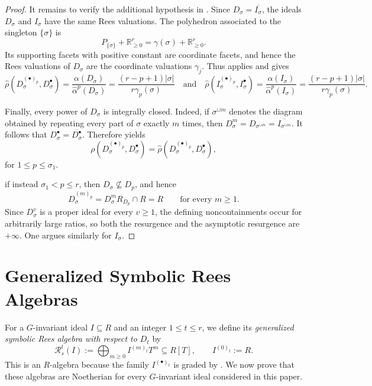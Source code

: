 \documentclass[11pt, reqno]{amsart}
\numberwithin{equation}{section}
\theoremstyle{definition}
\newcommand{\RR}{{\mathbb R}}
\newcommand{\s}{\sigma}
\begin{document}
\begin{proof}
It remains to verify the additional hypothesis in . Since $D_\sigma=\overline{I_\sigma}$, the ideals $D_\sigma$ and $I_\sigma$ have the same Rees valuations. The polyhedron associated to the singleton $\{\sigma\}$ is
\[
P_{\{\sigma\}}+\RR_{\geq0}^r
=\gamma(\sigma)+\RR_{\geq0}^r.
\]
Its supporting facets with positive constant are coordinate facets, and hence the Rees valuations of $D_\sigma$ are the coordinate valuations $\gamma_j$. Thus  applies and gives
\[
\widehat{\rho}(D_\sigma^{(\bullet)_p},D_\sigma^\bullet)
=\frac{\alpha(D_\sigma)}{\widehat{\alpha}^p(D_\sigma)}
=\frac{(r-p+1)|\sigma|}{r\gamma_p(\sigma)}
\quad \text{and} \quad
\widehat{\rho}(I_\sigma^{(\bullet)_p},I_\sigma^\bullet)
=\frac{\alpha(I_\sigma)}{\widehat{\alpha}^p(I_\sigma)}
=\frac{(r-p+1)|\sigma|}{r\gamma_p(\sigma)}.
\]

Finally, every power of $D_\sigma$ is integrally closed. Indeed, if $\sigma^{\sqcup m}$ denotes the diagram obtained by repeating every part of $\sigma$ exactly $m$ times, then
$
D_\sigma^m=D_{\sigma^{\sqcup m}}
=\overline{I_{\sigma^{\sqcup m}}}$.
It follows that $D_\sigma^\bullet=\overline{D_\sigma^\bullet}$. Therefore  yields
\[
\rho(D_\sigma^{(\bullet)_p},D_\sigma^\bullet)
=\widehat{\rho}(D_\sigma^{(\bullet)_p},D_\sigma^\bullet),
\]
for $1\leq p\leq\sigma_1$.

if instead $\sigma_1<p\leq r$, then $D_\sigma\not\subseteq D_p$, and hence
\[
D_\sigma^{(m)_p}=D_\sigma^mR_{D_p}\cap R=R
\qquad\text{for every }m\geq1.
\]
Since $D_\sigma^v$ is a proper ideal for every $v\geq1$, the defining noncontainments occur for arbitrarily large ratios, so both the resurgence and the asymptotic resurgence are $+\infty$. One argues similarly for $I_\s$.
		\end{proof}

\section{Generalized Symbolic Rees Algebras}\label{s: symbolic Rees}

For a $G$-invariant ideal $I\subseteq R$ and an integer $1\leq t\leq r$, we define its \emph{generalized symbolic Rees algebra with respect to $D_t$} by
\[
\mathcal R_s^t(I)
   :=\bigoplus_{m\geq0} I^{(m)_t}T^m\subseteq R[T],
\qquad I^{(0)_t}:=R.
\]
This is an $R$-algebra because the family $I^{(\bullet)_t}$ is graded by . We now prove that these algebras are Noetherian for every $G$-invariant ideal considered in this paper.
\end{document}
